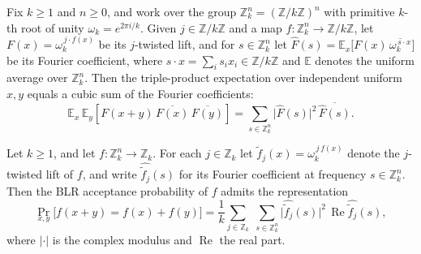\begin{lemma}
\label{ZkBLR.triple_product_fourier}
\leanok
{}
Fix $k \ge 1$ and $n \ge 0$, and work over the group $\mathbb{Z}_k^n =
(\mathbb{Z}/k\mathbb{Z})^n$ with primitive $k$-th root of unity $\omega_k = e^{2\pi
i/k}$. Given $j \in \mathbb{Z}/k\mathbb{Z}$ and a map $f \colon \mathbb{Z}_k^n \to
\mathbb{Z}/k\mathbb{Z}$, let $F(x) = \omega_k^{\,j\cdot f(x)}$ be its $j$-twisted lift,
and for $s \in \mathbb{Z}_k^n$ let $\widehat{F}(s) =
\mathbb{E}_x\!\big[F(x)\,\overline{\omega_k^{\,s\cdot x}}\big]$ be its Fourier
coefficient, where $s\cdot x = \sum_{i} s_i x_i \in \mathbb{Z}/k\mathbb{Z}$ and
$\mathbb{E}$ denotes the uniform average over $\mathbb{Z}_k^n$. Then the triple-product
expectation over independent uniform $x,y$ equals a cubic sum of the Fourier
coefficients:
\[
  \mathbb{E}_x\,\mathbb{E}_y\!\left[F(x+y)\,\overline{F(x)}\,\overline{F(y)}\right]
= \sum_{s\in\mathbb{Z}_k^n} \bigl\lvert
\widehat{F}(s)\bigr\rvert^2\,\overline{\widehat{F}(s)}.
\]
\end{lemma}

\begin{lemma}
\label{ZkBLR.BLR_accept_prob_eq_fourier_sum}
\leanok
{}
Let $k \ge 1$, and let $f : \mathbb{Z}_k^n \to \mathbb{Z}_k$. For each $j \in
\mathbb{Z}_k$ let $\widetilde{f}_j(x) = \omega_k^{\,j\,f(x)}$ denote the $j$-twisted
lift of $f$, and write $\widehat{\widetilde{f}_j}(s)$ for its Fourier coefficient at
frequency $s \in \mathbb{Z}_k^n$. Then the BLR acceptance probability of $f$ admits the
representation
\[
  \Pr_{x,y}\bigl[f(x+y)=f(x)+f(y)\bigr]
  = \frac{1}{k}
    \sum_{j\in\mathbb{Z}_k}\;
    \sum_{s\in\mathbb{Z}_k^n}
    \bigl|\widehat{\widetilde{f}_j}(s)\bigr|^2\,
    \operatorname{Re}\widehat{\widetilde{f}_j}(s),
\]
where $|\cdot|$ is the complex modulus and $\operatorname{Re}$ the real part.
\end{lemma}

